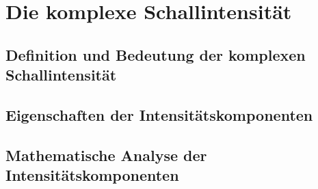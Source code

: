 %
%
%
%
\section{Die komplexe Schallintensität
\label{helmholtz:section:Schallintensitaet}}


\subsection{Definition und Bedeutung der komplexen Schallintensität
\label{helmholtz:subsection:def_Schallintensitaet}}

\subsection{Eigenschaften der Intensitätskomponenten
\label{helmholtz:subsection:def_Schallintensitaet}}


\subsection{Mathematische Analyse der Intensitätskomponenten
\label{helmholtz:subsection:def_Schallintensitaet}}



